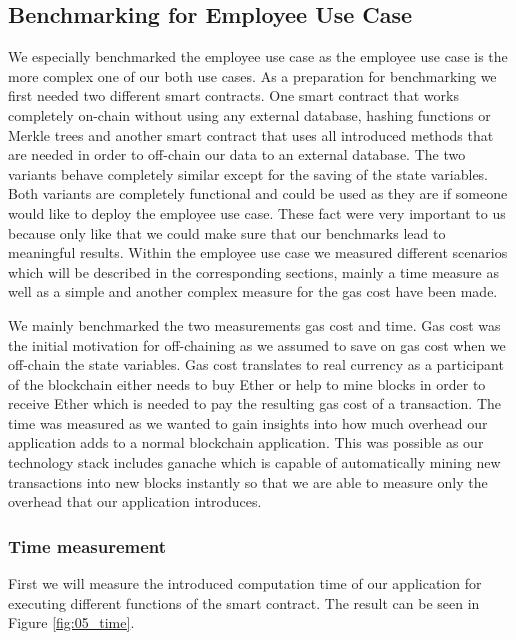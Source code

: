 \subsection{Benchmarking for Employee Use Case}
We especially benchmarked the employee use case as the employee use case is the more complex one of our both use cases. As a preparation for benchmarking we first needed two different smart contracts. One smart contract that works completely on-chain without using any external database, hashing functions or Merkle trees and another smart contract that uses all introduced methods that are needed in order to off-chain our data to an external database. The two variants behave completely similar except for the saving of the state variables. Both variants are completely functional and could be used as they are if someone would like to deploy the employee use case. These fact were very important to us because only like that we could make sure that our benchmarks lead to meaningful results. Within the employee use case we measured different scenarios which will be described in the corresponding sections, mainly a time measure as well as a simple and another complex measure for the gas cost have been made.

We mainly benchmarked the two measurements gas cost and time. Gas cost was the initial motivation for off-chaining as we assumed to save on gas cost when we off-chain the state variables. Gas cost translates to real currency as a participant of the blockchain either needs to buy Ether or help to mine blocks in order to receive Ether which is needed to pay the resulting gas cost of a transaction. The time was measured as we wanted to gain insights into how much overhead our application adds to a normal blockchain application. This was possible as our technology stack includes ganache which is capable of automatically mining new transactions into new blocks instantly so that we are able to measure only the overhead that our application introduces.

\subsubsection{Time measurement}
First we will measure the introduced computation time of our application for executing different functions of the smart contract. The result can be seen in Figure \ref{fig:05_time}.

